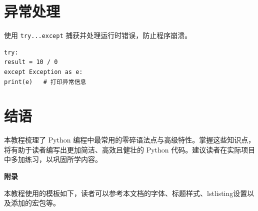 \documentclass{article}
\begin{document}
\section{异常处理}
使用 \texttt{try...except} 捕获并处理运行时错误，防止程序崩溃。
\begin{lstlisting}
try:
result = 10 / 0
except Exception as e:
print(e)   # 打印异常信息
\end{lstlisting}

\section{结语}
本教程梳理了 Python 编程中最常用的零碎语法点与高级特性。掌握这些知识点，将有助于读者编写出更加简洁、高效且健壮的 Python 代码。建议读者在实际项目中多加练习，以巩固所学内容。

\newpage
\begin{center}
	{\huge \textbf{附录}}
\end{center}
本教程使用的模板如下，读者可以参考本文档的字体、标题样式、lstlisting设置以及添加的宏包等。
\end{document}

